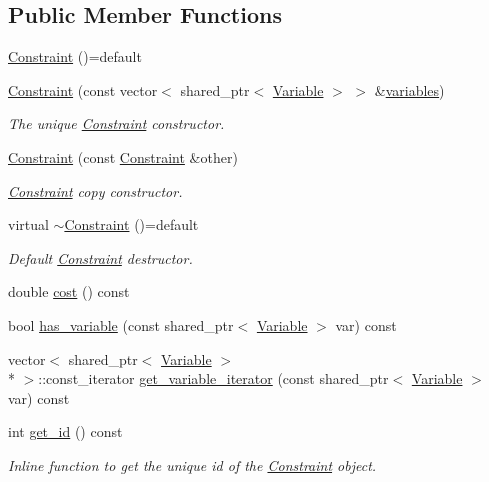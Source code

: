 \subsection*{Public Member Functions}
\begin{DoxyCompactItemize}
\item 
\hyperlink{classghost_1_1Constraint_a9632dde3e9486686466f1692706af5d9}{Constraint} ()=default
\item 
\hyperlink{classghost_1_1Constraint_afdc25eb190a7a0ec4171337fc80888f4}{Constraint} (const vector$<$ shared\-\_\-ptr$<$ \hyperlink{classghost_1_1Variable}{Variable} $>$ $>$ \&\hyperlink{classghost_1_1Constraint_a14585a4765af0acb14a14788929726c3}{variables})
\begin{DoxyCompactList}\small\item\em The unique \hyperlink{classghost_1_1Constraint}{Constraint} constructor. \end{DoxyCompactList}\item 
\hyperlink{classghost_1_1Constraint_a65ed5eb7814f9bc07750886cb2e7dbaa}{Constraint} (const \hyperlink{classghost_1_1Constraint}{Constraint} \&other)
\begin{DoxyCompactList}\small\item\em \hyperlink{classghost_1_1Constraint}{Constraint} copy constructor. \end{DoxyCompactList}\item 
virtual \hyperlink{classghost_1_1Constraint_aebea8263c24d0c3a5328c20ee0006f32}{$\sim$\-Constraint} ()=default
\begin{DoxyCompactList}\small\item\em Default \hyperlink{classghost_1_1Constraint}{Constraint} destructor. \end{DoxyCompactList}\item 
double \hyperlink{classghost_1_1Constraint_adfa4826bcaea9e4a692fb0c4630ca214}{cost} () const 
\item 
bool \hyperlink{classghost_1_1Constraint_a070d5d68a1291b99f178aa98440186bc}{has\-\_\-variable} (const shared\-\_\-ptr$<$ \hyperlink{classghost_1_1Variable}{Variable} $>$ var) const 
\item 
vector$<$ shared\-\_\-ptr$<$ \hyperlink{classghost_1_1Variable}{Variable} $>$\\*
 $>$\-::const\-\_\-iterator \hyperlink{classghost_1_1Constraint_a9a894b4700d26e59c48739c4292efc8a}{get\-\_\-variable\-\_\-iterator} (const shared\-\_\-ptr$<$ \hyperlink{classghost_1_1Variable}{Variable} $>$ var) const 
\item 
int \hyperlink{classghost_1_1Constraint_af483429a319284503ff634105cadbe08}{get\-\_\-id} () const 
\begin{DoxyCompactList}\small\item\em Inline function to get the unique id of the \hyperlink{classghost_1_1Constraint}{Constraint} object. \end{DoxyCompactList}\end{DoxyCompactItemize}
